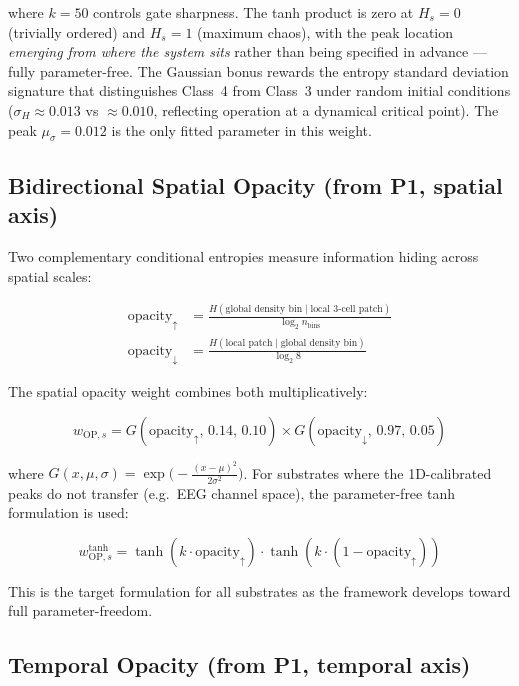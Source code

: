 \documentclass[12pt,a4paper]{article}
\begin{document}
where $k=50$ controls gate sharpness.
The tanh product is zero at $H_s=0$ (trivially ordered) and $H_s=1$
(maximum chaos), with the peak location \emph{emerging from where the
system sits} rather than being specified in advance --- fully
parameter-free.
The Gaussian bonus rewards the entropy standard deviation signature
that distinguishes Class~4 from Class~3 under random initial
conditions ($\sigma_H \approx 0.013$ vs $\approx 0.010$, reflecting
operation at a dynamical critical point).
The peak $\mu_\sigma = 0.012$ is the only fitted parameter in this
weight.

\subsection{Bidirectional Spatial Opacity (from P1, spatial axis)}

Two complementary conditional entropies measure information hiding
across spatial scales:

\begin{align}
\text{opacity}_\uparrow &=
  \frac{H(\text{global density bin} \mid \text{local 3-cell patch})}
       {\log_2 n_\text{bins}}
\label{eq:opup}\\[4pt]
\text{opacity}_\downarrow &=
  \frac{H(\text{local patch} \mid \text{global density bin})}
       {\log_2 8}
\label{eq:opdown}
\end{align}

The spatial opacity weight combines both multiplicatively:

\begin{equation}
w_{\text{OP},s} = G(\text{opacity}_\uparrow,\,0.14,\,0.10)
                  \times G(\text{opacity}_\downarrow,\,0.97,\,0.05)
\label{eq:wops}
\end{equation}

where $G(x,\mu,\sigma) = \exp\!\bigl(-\frac{(x-\mu)^2}{2\sigma^2}\bigr)$.
For substrates where the 1D-calibrated peaks do not transfer (e.g.\
EEG channel space), the parameter-free tanh formulation is used:

\begin{equation}
w_{\text{OP},s}^{\text{tanh}} = \tanh(k\cdot\text{opacity}_\uparrow)
                                  \cdot\tanh(k\cdot(1-\text{opacity}_\uparrow))
\label{eq:wops_tanh}
\end{equation}

This is the target formulation for all substrates as the framework
develops toward full parameter-freedom.

\subsection{Temporal Opacity (from P1, temporal axis)}
\end{document}
